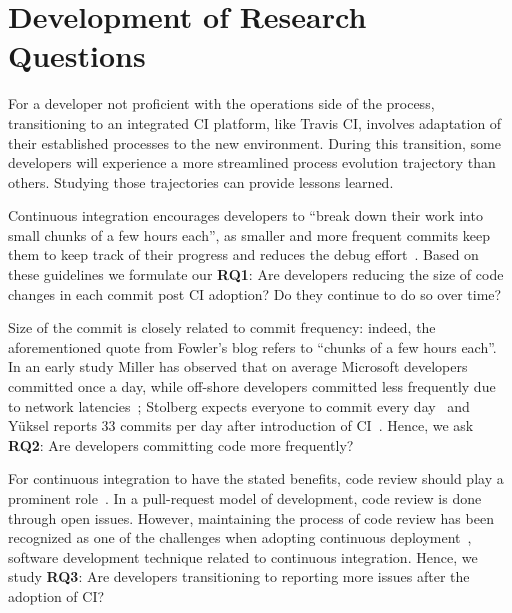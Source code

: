 
\section{Development of Research Questions}

For a developer not proficient with the operations side of the process, transitioning to an integrated CI platform, like Travis CI, involves adaptation of their established processes to the new environment. During this transition, some developers will experience a more streamlined process evolution trajectory than others. Studying those trajectories can provide lessons learned.


%

Continuous integration encourages developers to ``break down their work into small chunks of a few hours each'', 
as smaller and more frequent commits keep them to keep track of their progress and reduces the debug 
effort~\cite{Fowler,Duvall}. %
Based on these guidelines we formulate our \textbf{RQ1}: Are developers reducing the size of code changes in 
each commit post CI adoption? Do they continue to do so over time?

Size of the commit is closely related to commit frequency: indeed, the aforementioned quote from Fowler's blog refers to ``chunks of a few hours each''. 
In an early study Miller has observed that on average Microsoft developers committed once a day, while off-shore
 developers committed less frequently due to network latencies~\cite{Miller}; Stolberg expects everyone to 
 commit every day~\cite{Stolberg} and Y\"{u}ksel reports 33 commits per day after introduction of CI~\cite{Yuksel}. 
Hence, we ask \textbf{RQ2}: Are developers committing code more frequently?

For continuous integration to have the stated benefits, code review should play a prominent role~\cite{Miller}. 
In a pull-request model of development, code review is done through open issues.
However, maintaining the process of code review has been recognized as one of the challenges when 
adopting continuous deployment~\cite{ClapsBSA}, software development technique related to continuous integration.
Hence, we study \textbf{RQ3}: Are developers transitioning to reporting more issues after the adoption of CI?

